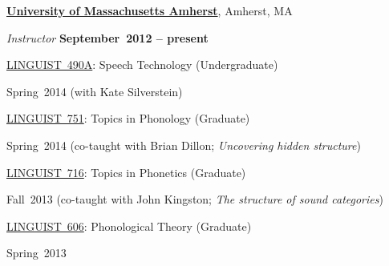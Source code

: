 \documentclass[10pt]{article}
\newcommand{\halfblankline}{\quad\vspace{-0.5\baselineskip}\pagebreak[3]}
\begin{document}
\href{http://www.umass.edu}{\textbf{University of Massachusetts Amherst}},
Amherst, MA
\begin{outerlist}

\item[] \textit{Instructor}%
    \hfill \textbf{September~2012 -- present}
    \begin{innerlist}

        \item \href{http://www.umass.edu/linguist/courses/detail.php?cid=627}{LINGUIST~490A}:
          Speech Technology (Undergraduate)
        \begin{innerlist}[\enskip$\circ$,leftmargin=*]
            \item Spring~2014 (with Kate Silverstein)
        \end{innerlist}

        \halfblankline

        \item \href{http://www.umass.edu/linguist/courses/detail.php?cid=631}{LINGUIST~751}:
          Topics in Phonology (Graduate)
        \begin{innerlist}[\enskip$\circ$,leftmargin=*]
            \item Spring~2014 (co-taught with Brian Dillon; \emph{Uncovering hidden structure})
        \end{innerlist}

        \halfblankline

        \item \href{http://www.umass.edu/linguist/courses/detail.php?cid=547}{LINGUIST~716}:
          Topics in Phonetics (Graduate)
        \begin{innerlist}[\enskip$\circ$,leftmargin=*]
            \item Fall~2013 (co-taught with John Kingston; \emph{The structure of sound categories})
        \end{innerlist}

        \halfblankline

        \item \href{http://www.umass.edu/linguist/courses/detail.php?cid=475}{LINGUIST~606}:
          Phonological Theory (Graduate)
        \begin{innerlist}[\enskip$\circ$,leftmargin=*]
            \item Spring~2013
        \end{innerlist}

        \halfblankline


\end{innerlist}
\end{outerlist}
\end{document}
